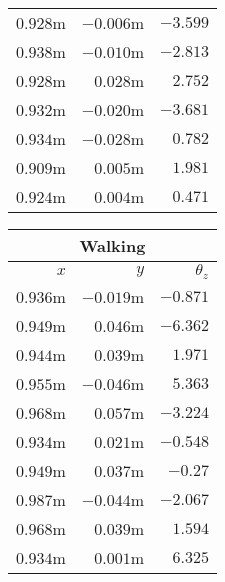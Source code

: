 \begin{appendices}
\begin{table}[!h]
\begin{tabular}{ r r r }
		$0.928$m &
		$-0.006$m &
		$-3.599$\textdegree{} \\

		$0.938$m &
		$-0.010$m &
		$-2.813$\textdegree{} \\

		$0.928$m &
		$0.028$m &
		$2.752$\textdegree{} \\

		$0.932$m &
		$-0.020$m &
		$-3.681$\textdegree{} \\

		$0.934$m &
		$-0.028$m &
		$0.782$\textdegree{} \\

		$0.909$m &
		$0.005$m &
		$1.981$\textdegree{} \\

		\midrule
		$0.924$m &
		$0.004$m &
		$0.471$\textdegree{} \\
		\bottomrule
	\end{tabular}
	\hspace{2ex}
	\begin{tabular}{ r r r }
		\toprule
		\multicolumn{3}{c}{\textbf{Walking}} \\
		\midrule
		\textbf{$x$} & \textbf{$y$} & \textbf{$\theta_z$} \\
		\midrule
		$0.936$m &
		$-0.019$m &
		$-0.871$\textdegree{} \\

		$0.949$m &
		$0.046$m &
		$-6.362$\textdegree{} \\

		$0.944$m &
		$0.039$m &
		$1.971$\textdegree{} \\

		$0.955$m &
		$-0.046$m &
		$5.363$\textdegree{} \\

		$0.968$m &
		$0.057$m &
		$-3.224$\textdegree{} \\

		$0.934$m &
		$0.021$m &
		$-0.548$\textdegree{} \\

		$0.949$m &
		$0.037$m &
		$-0.27$\textdegree{} \\

		$0.987$m &
		$-0.044$m &
		$-2.067$\textdegree{} \\

		$0.968$m &
		$0.039$m &
		$1.594$\textdegree{} \\

		$0.934$m &
		$0.001$m &
		$6.325$\textdegree{} \\


\end{tabular}
\end{table}
\end{appendices}
